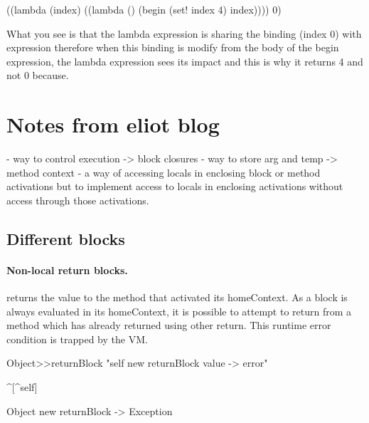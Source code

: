 \documentclass[a4paper,10pt,twoside]{book}
\begin{document}
\begin{code}{}
((lambda (index)
   ((lambda () (begin 
                (set! index 4)
                index))))
 0)
\end{code}


What you see is that the lambda expression is sharing the binding (index 0) with expression 
therefore when this binding is modify from the body of the begin expression, the lambda expression sees its impact
and this is why it returns 4 and not 0 because. 


\section{Notes from eliot blog}



- way to control execution -> block closures
- way to store arg and temp -> method context
- a way of accessing locals in enclosing block or method activations
but to implement access to locals in enclosing activations without access through those activations.








\subsection{Different blocks} 

\paragraph{Non-local return blocks.} \ct{[:x :y| x*x. ^ x + y]} returns the value to the method that activated its homeContext. As a block is always evaluated in its homeContext, it is possible to attempt to return from a method which has already returned using other return. This runtime error condition is trapped by the VM.

\begin{code}{}
Object>>returnBlock
	"self new returnBlock value -> error"

	^[^self]

Object new returnBlock
-> Exception
\end{code}	
	
	












\ifx\wholebook\relax\else
   
   
\end{document}
